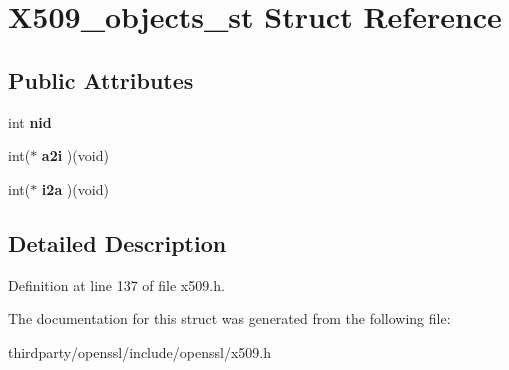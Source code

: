 \hypertarget{struct_x509__objects__st}{}\section{X509\+\_\+objects\+\_\+st Struct Reference}
\label{struct_x509__objects__st}
\subsection*{Public Attributes}
\begin{DoxyCompactItemize}
\item 
\mbox{\label{struct_x509__objects__st_a8f3f79c1037e355813b601c2c9c4d019}} 
int {\bfseries nid}
\item 
\mbox{\label{struct_x509__objects__st_a6b2bfa8ee8cf1a8acc1add5d1f3940ef}} 
int($\ast$ {\bfseries a2i} )(void)
\item 
\mbox{\label{struct_x509__objects__st_a7e32841a9585320493acee913eb32ae6}} 
int($\ast$ {\bfseries i2a} )(void)
\end{DoxyCompactItemize}


\subsection{Detailed Description}


Definition at line 137 of file x509.\+h.



The documentation for this struct was generated from the following file\+:\begin{DoxyCompactItemize}
\item 
thirdparty/openssl/include/openssl/x509.\+h\end{DoxyCompactItemize}
